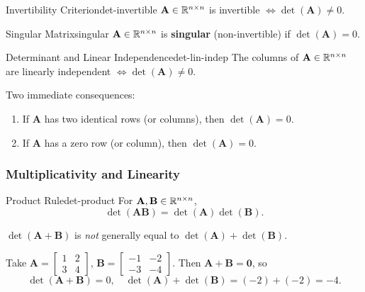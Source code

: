 \begin{theorem}{Invertibility Criterion}{det-invertible}
  $\mathbf{A} \in \mathbb{R}^{n \times n}$ is invertible $\iff \det(\mathbf{A}) \neq 0$.
\end{theorem}

\begin{definition}{Singular Matrix}{singular}
  $\mathbf{A} \in \mathbb{R}^{n \times n}$ is \textbf{singular} (non-invertible) if $\det(\mathbf{A}) = 0$.
\end{definition}

\begin{theorem}{Determinant and Linear Independence}{det-lin-indep}
  The columns of $\mathbf{A} \in \mathbb{R}^{n \times n}$ are linearly independent $\iff \det(\mathbf{A}) \neq 0$.
\end{theorem}

\begin{remark}
  Two immediate consequences:
  \begin{enumerate}
    \item If $\mathbf{A}$ has two identical rows (or columns), then $\det(\mathbf{A}) = 0$.
    \item If $\mathbf{A}$ has a zero row (or column), then $\det(\mathbf{A}) = 0$.
  \end{enumerate}
\end{remark}

\subsubsection{Multiplicativity and Linearity}

\begin{theorem}{Product Rule}{det-product}
  For $\mathbf{A}, \mathbf{B} \in \mathbb{R}^{n \times n}$,
  \[
    \det(\mathbf{A}\mathbf{B}) = \det(\mathbf{A}) \det(\mathbf{B}).
  \]
\end{theorem}

\begin{remark}
  $\det(\mathbf{A} + \mathbf{B})$ is \emph{not} generally equal to $\det(\mathbf{A}) + \det(\mathbf{B})$.
\end{remark}

\begin{example}
  Take $\mathbf{A} =
    \begin{bmatrix}
      1 & 2 \\ 3 & 4
    \end{bmatrix}
  $, $\mathbf{B} =
    \begin{bmatrix}
      -1 & -2 \\ -3 & -4
    \end{bmatrix}
  $. Then $\mathbf{A} + \mathbf{B} = \mathbf{0}$, so
  \[
    \det(\mathbf{A} + \mathbf{B}) = 0,
    \quad
    \det(\mathbf{A}) + \det(\mathbf{B}) = (-2) + (-2) = -4.
  \]
\end{example}

